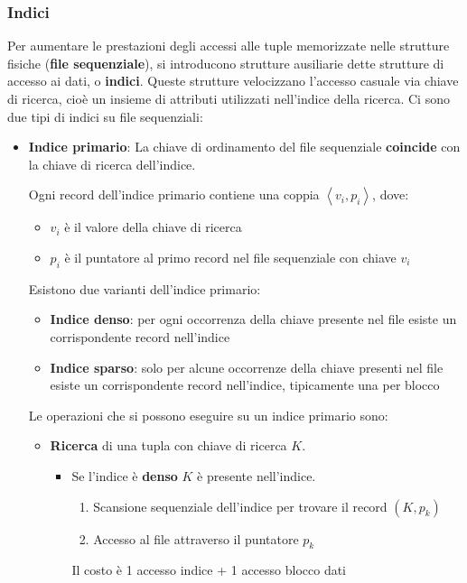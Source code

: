 \documentclass[a4paper]{article}
\begin{document}
\subsubsection{Indici}
Per aumentare le prestazioni degli accessi alle tuple memorizzate nelle strutture
fisiche (\textbf{file sequenziale}), si introducono strutture ausiliarie dette
strutture di accesso ai dati, o \textbf{indici}. Queste strutture velocizzano l'accesso
casuale via chiave di ricerca, cioè un insieme di attributi utilizzati nell'indice
della ricerca. Ci sono due tipi di indici su file sequenziali:
\begin{itemize}
  \item \textbf{Indice primario}: La chiave di ordinamento del file sequenziale 
    \textbf{coincide} con la chiave di ricerca dell'indice.

    Ogni record dell'indice primario contiene una coppia \( \left<v_i, p_i \right> \),
    dove:
    \begin{itemize}
      \item \( v_i \) è il valore della chiave di ricerca
      \item \( p_i \) è il puntatore al primo record nel file sequenziale con chiave
        \( v_i \) 
    \end{itemize}
    Esistono due varianti dell'indice primario:
    \begin{itemize}
      \item \textbf{Indice denso}: per ogni occorrenza della chiave presente nel file
        esiste un corrispondente record nell'indice

      \item \textbf{Indice sparso}: solo per alcune occorrenze della chiave presenti
        nel file esiste un corrispondente record nell'indice, tipicamente una per
        blocco
    \end{itemize}

    Le operazioni che si possono eseguire su un indice primario sono:
    \begin{itemize}
      \item \textbf{Ricerca} di una tupla con chiave di ricerca \( K \).
        \begin{itemize}
          \item Se l'indice è \textbf{denso} \( K \) è presente nell'indice.
            \begin{enumerate}
              \item Scansione sequenziale dell'indice per trovare il record \( \left(K, p_k\right) \)
              \item Accesso al file attraverso il puntatore \( p_k \)
            \end{enumerate}
            Il costo è 1 accesso indice + 1 accesso blocco dati


\end{itemize}
\end{itemize}
\end{itemize}
\end{document}
